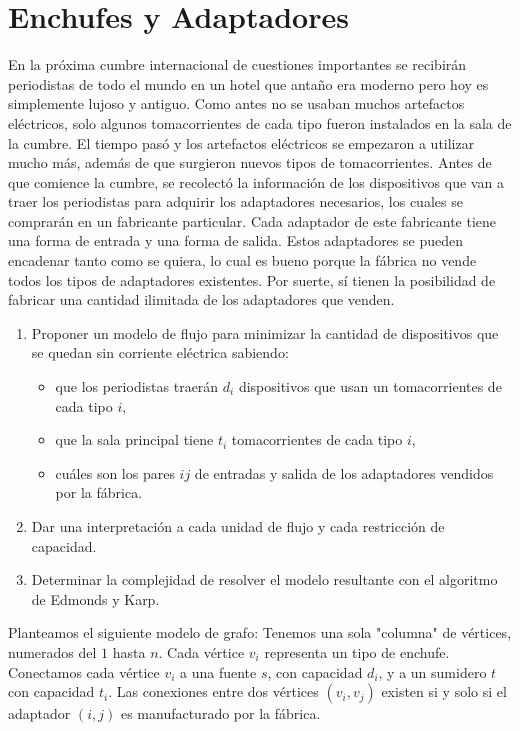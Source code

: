 \documentclass{article}
\begin{document}
\section*{Enchufes y Adaptadores}

En la próxima cumbre internacional de cuestiones importantes se recibirán periodistas de todo el mundo en un hotel que antaño era moderno pero hoy es simplemente lujoso y antiguo. Como antes no se usaban muchos artefactos eléctricos, solo algunos tomacorrientes de cada tipo fueron instalados en la sala de la cumbre. El tiempo pasó y los artefactos eléctricos se empezaron a utilizar mucho más, además de que surgieron nuevos tipos de tomacorrientes. Antes de que comience la cumbre, se recolectó la información de los dispositivos que van a traer los periodistas para adquirir los adaptadores necesarios, los cuales se comprarán en un fabricante particular. Cada adaptador de este fabricante tiene una forma de entrada y una forma de salida. Estos adaptadores se pueden encadenar tanto como se quiera, lo cual es bueno porque la fábrica no vende todos los tipos de adaptadores existentes. Por suerte, sí tienen la posibilidad de fabricar una cantidad ilimitada de los adaptadores que venden.

\begin{enumerate}
    \item Proponer un modelo de flujo para minimizar la cantidad de dispositivos que se quedan sin corriente eléctrica sabiendo:
    \begin{itemize}
        \item que los periodistas traerán $d_i$ dispositivos que usan un tomacorrientes de cada tipo $i$,
        \item que la sala principal tiene $t_i$ tomacorrientes de cada tipo $i$,
        \item cuáles son los pares $ij$ de entradas y salida de los adaptadores vendidos por la fábrica.
    \end{itemize}
    
    \item Dar una interpretación a cada unidad de flujo y cada restricción de capacidad.
    
    \item Determinar la complejidad de resolver el modelo resultante con el algoritmo de Edmonds y Karp.
\end{enumerate}

Planteamos el siguiente modelo de grafo: Tenemos una sola "columna" de vértices, numerados del $1$ hasta $n$. Cada vértice $v_i$ representa un tipo de enchufe. Conectamos cada vértice $v_i$ a una fuente $s$, con capacidad $d_i$, y a un sumidero $t$ con capacidad $t_i$. Las conexiones entre dos vértices $(v_i,v_j)$ existen si y solo si el adaptador $(i,j)$ es manufacturado por la fábrica.
\end{document}
